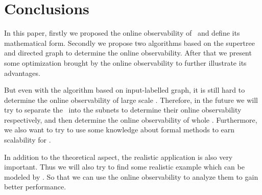 \section{Conclusions}
\label{sec:con}
In this paper, firstly we proposed the online observability of \BCNs\ and define its mathematical form. Secondly we propose two algorithms based on the supertree and directed graph to determine the online observability. After that we present some optimization brought by the online observability to further illustrate its advantages. 


But even with the algorithm based on input-labelled graph, it is still hard to determine the online observability of large scale \BCNs. Therefore, in the future we will try to separate the \BCN\ into the subnets to determine their online observability respectively, and then determine the online observability of whole \BCN. Furthermore, we also want to try to use some knowledge about formal methods to earn scalability for \BCNs. 

In addition to the theoretical aspect, the realistic application is also very important. Thus we will also try to find some realistic example which can be modeled by \BCNs. So that we can use the online observability to analyze them to gain better performance.